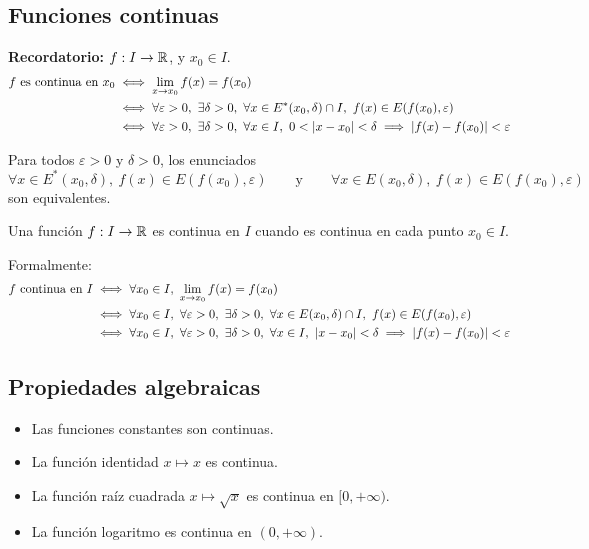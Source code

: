 \documentclass[11pt,a4paper]{article}
\newcommand{\Er}{E^{*}}                 %
\begin{document}

\subsection{Funciones continuas}

\textbf{Recordatorio:} $f:I\to\mathbb{R}$, y $x_0\in I$.
\begin{align*}
  f \text{ es continua en } x_0
  &\iff \lim_{x\to x_0}f(x)=f(x_0)\\
  &\iff \forall\varepsilon>0,\ \exists\delta>0,\ \forall x\in\Er(x_0,\delta)\cap I,\ f(x)\in E(f(x_0),\varepsilon)\\
  &\iff \forall\varepsilon>0,\ \exists\delta>0,\ \forall x\in I,\ 0<\abs{x-x_0}<\delta\implies\abs{f(x)-f(x_0)}<\varepsilon
\end{align*}

\begin{observacion}
Para todos $\varepsilon>0$ y $\delta>0$, los enunciados
\[
  \forall x\in\Er(x_0,\delta),\ f(x)\in E(f(x_0),\varepsilon)
  \qquad\text{y}\qquad
  \forall x\in E(x_0,\delta),\ f(x)\in E(f(x_0),\varepsilon)
\]
son equivalentes.
\end{observacion}

\begin{definicion}
Una función $f:I\to\mathbb{R}$ es continua en $I$ cuando es continua en cada punto $x_0\in I$.

Formalmente:
\begin{align*}
  f \text{ continua en } I
  &\iff \forall x_0\in I,\ \lim_{x\to x_0}f(x)=f(x_0)\\
  &\iff \forall x_0\in I,\ \forall\varepsilon>0,\ \exists\delta>0,\ \forall x\in E(x_0,\delta)\cap I,\ f(x)\in E(f(x_0),\varepsilon)\\
  &\iff \forall x_0\in I,\ \forall\varepsilon>0,\ \exists\delta>0,\ \forall x\in I,\ \abs{x-x_0}<\delta\implies\abs{f(x)-f(x_0)}<\varepsilon
\end{align*}
\end{definicion}

\subsection{Propiedades algebraicas}

\begin{itemize}
  \item Las funciones constantes son continuas.
  \item La función identidad $x\mapsto x$ es continua.
  \item La función raíz cuadrada $x\mapsto\sqrt x$ es continua en $[0,+\infty)$.
  \item La función logaritmo es continua en $(0,+\infty)$.
\end{itemize}
\end{document}

